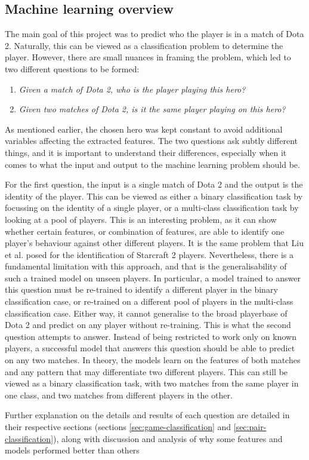 \documentclass[Report.tex]{subfiles}
\begin{document}
\subsection{Machine learning overview}
The main goal of this project was to predict who the player is in a match of Dota 2. Naturally, this can be viewed as a classification problem to determine the player. However, there are small nuances in framing the problem, which led to two different questions to be formed:

\begin{enumerate}
\item \textit{Given a match of Dota 2, who is the player playing this hero?}
\item \textit{Given two matches of Dota 2, is it the same player playing on this hero?}
\end{enumerate}

As mentioned earlier, the chosen hero was kept constant to avoid additional variables affecting the extracted features. The two questions ask subtly different things, and it is important to understand their differences, especially when it comes to what the input and output to the machine learning problem should be. 

For the first question, the input is a single match of Dota 2 and the output is the identity of the player. This can be viewed as either a binary classification task by focussing on the identity of a single player, or a multi-class classification task by looking at a pool of players. This is an interesting problem, as it can show whether certain features, or combination of features, are able to identify one player's behaviour against other different players. It is the same problem that Liu et al. \cite{starcraft-identification} posed for the identification of Starcraft 2 players. Nevertheless, there is a fundamental limitation with this approach, and that is the generalisability of such a trained model on unseen players. In particular, a model trained to answer this question must be re-trained to identify a different player in the binary classification case, or re-trained on a different pool of players in the multi-class classification case. Either way, it cannot generalise to the broad playerbase of Dota 2 and predict on any player without re-training. This is what the second question attempts to answer. Instead of being restricted to work only on known players, a successful model that answers this question should be able to predict on any two matches. In theory, the models learn on the features of both matches and any pattern that may differentiate two different players. This can still be viewed as a binary classification task, with two matches from the same player in one class, and two matches from different players in the other. 

Further explanation on the details and results of each question are detailed in their respective sections (sections \ref{sec:game-classification} and \ref{sec:pair-classification}), along with discussion and analysis of why some features and models performed better than others 
\end{document}
